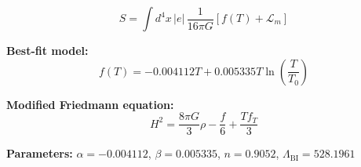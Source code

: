 
\begin{equation}
  S = \int d^4x \, |e| \, \frac{1}{16\pi G} \left[ f(T) + \mathcal{L}_m \right]
\end{equation}

\textbf{Best-fit model:}
\begin{equation}
  f(T) = -0.004112 T + 0.005335 T \ln\!\left(\frac{T}{T_0}\right)
\end{equation}

\textbf{Modified Friedmann equation:}
\begin{equation}
  H^2 = \frac{8\pi G}{3} \rho - \frac{f}{6} + \frac{T f_T}{3}
\end{equation}

\textbf{Parameters:}
$\alpha = -0.004112$, \quad
$\beta = 0.005335$, \quad
$n = 0.9052$, \quad
$\Lambda_{\text{BI}} = 528.1961$